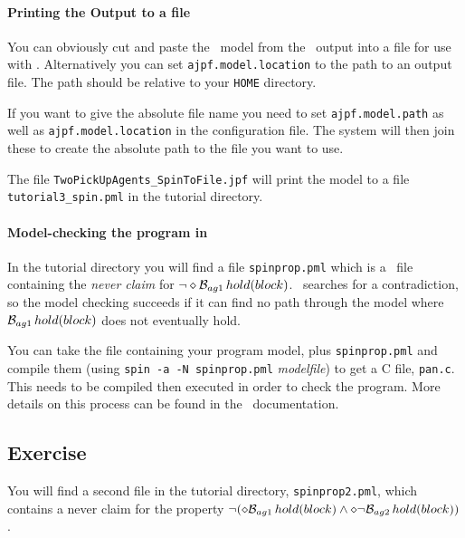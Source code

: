 \paragraph{Printing the Output to a file} You can obviously cut and paste the \promela\ model from the \ajpf\ output into a file for use with \spin.  Alternatively you can set \texttt{ajpf.model.location} to the path to an output file.  The path should be relative to your \texttt{HOME} directory.  

If you want to give the absolute file name you need to set \texttt{ajpf.model.path} as well as \texttt{ajpf.model.location} in the configuration file.  The system will then join these to create the absolute path to the file you want to use.

The file \texttt{TwoPickUpAgents\_SpinToFile.jpf} will print the model to a file \texttt{tutorial3\_spin.pml} in the tutorial directory.

\paragraph{Model-checking the program in \spin}  In the tutorial directory you will find a file \texttt{spinprop.pml} which is a \promela\ file containing the \emph{never claim} for $\neg \diamond \mathrm{{\cal B}}_{ag1} \, hold(block)$.  \spin\ searches for a contradiction, so the model checking succeeds if it can find no path through the model where $\mathrm{{\cal B}}_{ag1} \, hold(block)$ does not eventually hold.  

You can take the file containing  your program model, plus \texttt{spinprop.pml} and compile them (using \texttt{spin -a -N spinprop.pml} \emph{modelfile}) to get a C file, \texttt{pan.c}.  This needs to be compiled then executed in order to check the program.  More details on this process can be found in the \spin\ documentation.

\subsection{Exercise}

You will find a second file in the tutorial directory, \texttt{spinprop2.pml}, which contains a never claim for the property $\neg (\diamond \mathrm{{\cal B}}_{ag1} \, hold(block) \wedge \diamond \neg \mathrm{{\cal B}}_{ag2} \, hold(block))$.

